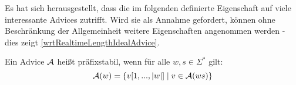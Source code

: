 \begin{comment}
    \begin{satz}
        Es gibt einen Zellularautomaten $C$,
        sodass für $i \in \Z$ und $t \in \Nz$ mit $i - 2 < t < 3*2^{2-i+t}-i$ gilt:
        \[
            (\Delta^{t}_{C}(c_{exp})_i)_e = 1 \Leftrightarrow \exists k \in \Nz: i + t = 2^k
        \]
        Wegen \cref{lemmaNumberTheoryInequality} gilt die Aussage insbesondere,
        falls $i \geq 1$ und $t \geq 2i - 2$.
    \end{satz}
    \begin{proof}
        Nach \cref{linksunabhaengigSpeedup} gibt es einen Zellularautomaten $C$,
        sodass $\Delta^t_{C}(c_{exp})_i = \Delta^{2t}_{C_{exp}}(c_{exp})_{i-t}$.
        Aus den Voraussetzungen folgt, dass $i-t < 2$ und $2t < 3 * 2^{2-(i-t)}-(i-t)$.
        Es gilt damit mit \cref{lemmaCExpProp2}:
        \[
            i + t = (i-t) + 2t = 2^k
            \Leftrightarrow(\Delta^{2t}_{C_{exp}}(c_{exp})_{i-t})_e = 1
            \Leftrightarrow (\Delta^t_{C}(c_{exp})_{i})_e = 1
        \]        
        
    \end{proof}
\end{comment}


Es hat sich herausgestellt, dass die im folgenden definierte Eigenschaft auf viele interessante Advices zutrifft.
Wird sie als Annahme gefordert, können ohne Beschränkung der Allgemeinheit weitere Eigenschaften angenommen werden - 
dies zeigt \cref{wrtRealtimeLengthIdealAdvice}.

\begin{definition}[Präfixstabil]
    Ein Advice $\mathcal{A}$ heißt präfixstabil, wenn für alle $w, s \in \Sigma^*$ gilt:
    \[
        \mathcal{A}(w) =
        \{ { v[1, ..., |w|] } \; | \; { v \in \mathcal{A}(ws) } \}
    \]
\end{definition}

